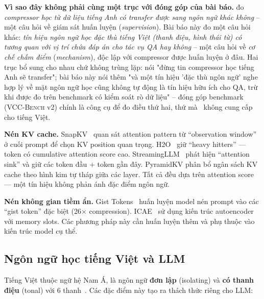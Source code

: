 \documentclass[12pt,a4paper]{article}
\newcommand{\method}[1]{\textsc{#1}}         %
\begin{document}
\textbf{Vì sao đây không phải cùng một trục với đóng góp của bài báo.} \cite{lukauskas2026lost} đo \textit{compressor học từ dữ liệu tiếng Anh có transfer được sang ngôn ngữ khác không} -- một câu hỏi về giám sát huấn luyện (\textit{supervision}). Bài báo này đo một câu hỏi khác: \textit{tín hiệu ngôn ngữ học đặc thù tiếng Việt (thanh điệu, hình thái từ) có tương quan với vị trí chứa đáp án cho tác vụ QA hay không} -- một câu hỏi về \textit{cơ chế chấm điểm} (\textit{mechanism}), độc lập với compressor được huấn luyện ở đâu. Hai trục bổ sung cho nhau chứ không trùng lặp: \cite{lukauskas2026lost} nói "đừng tin compressor học tiếng Anh sẽ transfer"; bài báo này nói thêm "và một tín hiệu 'đặc thù ngôn ngữ' nghe hợp lý về mặt ngôn ngữ học cũng không tự động là tín hiệu hữu ích cho QA, trừ khi được đo trên benchmark có kiểm soát rò dữ liệu" -- đóng góp benchmark (\method{VCC-Bench} v2) chính là công cụ để đo điều thứ hai, thứ mà~\cite{lukauskas2026lost} không cung cấp cho tiếng Việt.

\textbf{Nén KV cache.} SnapKV~\cite{li2024snapkv} quan sát attention pattern từ ``observation window'' ở cuối prompt để chọn KV position quan trọng. H2O~\cite{zhang2023h2o} giữ ``heavy hitters'' --- token có cumulative attention score cao. StreamingLLM~\cite{xiao2024streamingllm} phát hiện ``attention sink'' và giữ các token đầu + token gần đây. PyramidKV phân bổ ngân sách KV cache theo hình kim tự tháp giữa các layer. Tất cả đều dựa trên attention score --- một tín hiệu không phản ánh đặc điểm ngôn ngữ.

\textbf{Nén không gian tiềm ẩn.} Gist Tokens~\cite{mu2023gist} huấn luyện model nén prompt vào các ``gist token'' đặc biệt (26$\times$ compression). ICAE~\cite{ge2024icae} sử dụng kiến trúc autoencoder với memory slots. Các phương pháp này cần huấn luyện thêm và phụ thuộc vào kiến trúc model cụ thể.

\subsection{Ngôn ngữ học tiếng Việt và LLM}

Tiếng Việt thuộc ngữ hệ Nam Á, là ngôn ngữ \textbf{đơn lập} (isolating) và \textbf{có thanh điệu} (tonal) với 6 thanh~\cite{nguyen1997vietnamese}. Các đặc điểm này tạo ra thách thức riêng cho LLM:
\end{document}
